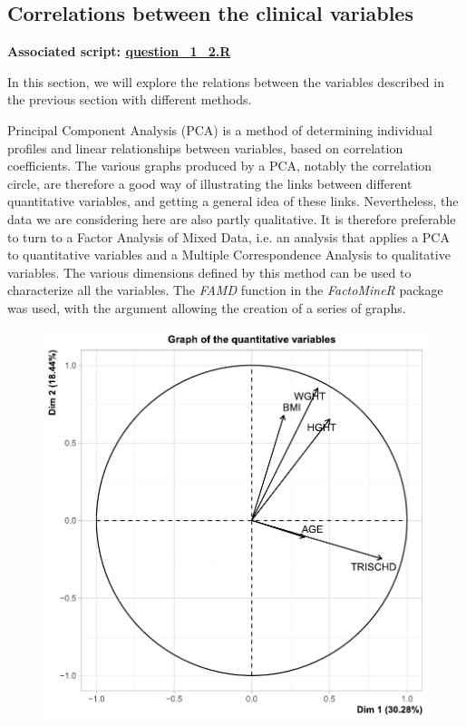 \documentclass[a4paper, 11pt]{article}
\begin{document}
\begin{multicols}{2}
\subsection{Correlations between the clinical variables}
\begin{scriptsize}	
	\textbf{Associated script: \href{https://github.com/leopoldguyot/BINF-F401-Project/blob/main/question_1_2.R}{question\_1\_2.R}}
\end{scriptsize}

In this section, we will explore the relations between the variables described in the previous section with different methods.

Principal Component Analysis (PCA) is a method of determining individual profiles and linear relationships between variables, based on correlation coefficients. 
The various graphs produced by a PCA, notably the correlation circle, are therefore a good way of illustrating the links between different quantitative variables, and getting a general idea of these links. 
Nevertheless, the data we are considering here are also partly qualitative. It is therefore preferable to turn to a Factor Analysis of Mixed Data, i.e. an analysis that applies a PCA to quantitative variables and a Multiple Correspondence Analysis to qualitative variables. 
The various dimensions defined by this method can be used to characterize all the variables. The \textit{FAMD} function in the \textit{FactoMineR} package was used, with the argument allowing the creation of a series of graphs.
\begin{figure}[H]
	\centering
	\includegraphics[width=\columnwidth]{figures/clinical_correlation_plots/all_quant_Dim2}

\end{figure}
\end{multicols}
\end{document}
